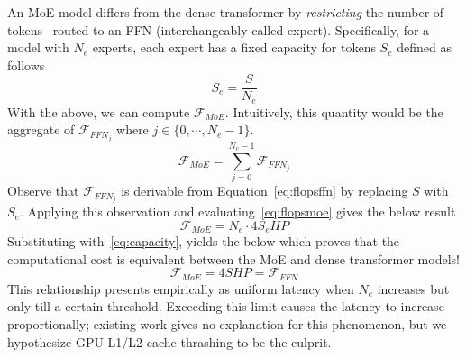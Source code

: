 An MoE model differs from the dense transformer by \emph{restricting} the number of
tokens~\cite{DBLP:conf/iclr/LepikhinLXCFHKS21, MLSYS2023_5a54f793} routed to an FFN
(interchangeably called expert).
Specifically, for a model with $N_e$ experts, each expert has a fixed capacity for tokens $S_e$ defined as follows
\begin{equation}\label{eq:capacity}
S_e = \frac{S}{N_e}
\end{equation}
With the above, we can compute $\mathcal{F}_{MoE}$.
Intuitively, this quantity would be the aggregate of $\mathcal{F}_{{FFN}_j}$ where $j \in \{0, \cdots, N_e - 1\}$.
\begin{equation}\label{eq:flopsmoe}
\mathcal{F}_{MoE} = \sum\limits_{j = 0}^{N_e - 1}\mathcal{F}_{{FFN}_j}
\end{equation}
Observe that $\mathcal{F}_{{FFN}_j}$ is derivable from Equation~\ref{eq:flopsffn}
by replacing $S$ with $S_e$.
Applying this observation and evaluating~\ref{eq:flopsmoe} gives the below result
\begin{equation}\label{eq:flopsmoe2}
\mathcal{F}_{MoE} = N_e \cdot 4S_{e}HP
\end{equation}
Substituting with~\ref{eq:capacity}, yields the below which proves that the computational cost is equivalent
between the MoE and dense transformer models!
\begin{equation}\label{eq:equivalence}
\mathcal{F}_{MoE} = 4SHP = \mathcal{F}_{FFN}
\end{equation}
This relationship presents empirically as uniform latency when $N_e$
increases but only till a certain threshold.
Exceeding this limit causes the latency to increase proportionally;
existing work gives no explanation for this phenomenon, but we
hypothesize GPU L1/L2 cache thrashing to be the culprit.

